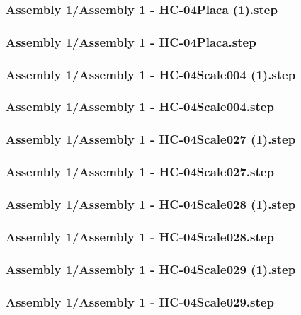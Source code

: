 \documentclass[a4paper,12pt]{article}
\begin{document}
\begin{lstlising}[language=C++]
\subsubsection{Assembly 1/Assembly 1 - HC-04Placa (1).step}

\subsubsection{Assembly 1/Assembly 1 - HC-04Placa.step}

\subsubsection{Assembly 1/Assembly 1 - HC-04Scale004 (1).step}

\subsubsection{Assembly 1/Assembly 1 - HC-04Scale004.step}

\subsubsection{Assembly 1/Assembly 1 - HC-04Scale027 (1).step}

\subsubsection{Assembly 1/Assembly 1 - HC-04Scale027.step}

\subsubsection{Assembly 1/Assembly 1 - HC-04Scale028 (1).step}

\subsubsection{Assembly 1/Assembly 1 - HC-04Scale028.step}

\subsubsection{Assembly 1/Assembly 1 - HC-04Scale029 (1).step}

\subsubsection{Assembly 1/Assembly 1 - HC-04Scale029.step}


\end{lstlising}
\end{document}

